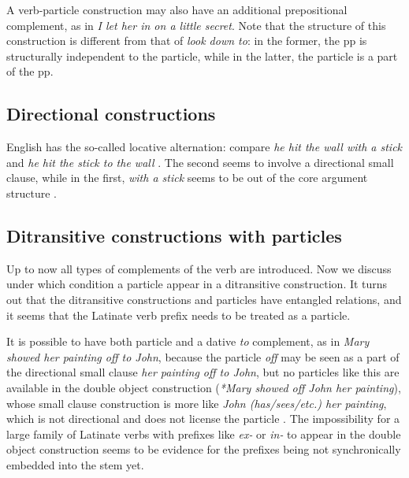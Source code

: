 \documentclass[UTF8, a4paper, oneside, scheme=plain, 12pt]{ctexbook}
\newcommand*{\citesec}[1]{\S~{#1}}
\newcommand{\form}[1]{\emph{#1}}
\begin{document}
A verb-particle construction may also have an additional prepositional complement,
as in \form{I let her in on a little secret}.
Note that the structure of this construction is different from 
that of \form{look down to}:
in the former, the \ac{pp} is structurally independent to the particle,
while in the latter, the particle is a part of the \ac{pp}.

\subsection{Directional constructions}

English has the so-called locative alternation:
compare \form{he hit the wall with a stick}
and \form{he hit the stick to the wall}
\citep[\citesec{4.2}]{dixon2005semantic}.
The second seems to involve a directional small clause,
while in the first, \form{with a stick} seems to be out of 
the core argument structure \citep{acedo2013satellite}. 

\subsection{Ditransitive constructions with particles}\label{sec:clause.ditransitive-particle}

Up to now all types of complements of the verb are introduced.
Now we discuss under which condition a particle appear in a ditransitive construction. 
It turns out that
the ditransitive constructions and particles have entangled relations, 
and it seems that the Latinate verb prefix needs to be treated as a particle.

It is possible to have both particle and a dative \form{to} complement, 
as in \form{Mary showed her painting off to John}, 
because the particle \form{off} may be seen as a part 
of the directional small clause \form{her painting off to John}, 
but no particles like this are available in the double object construction
(\form{*Mary showed off John her painting}),
whose small clause construction is more like \form{John (has/sees/etc.) her painting},
which is not directional and does not license the particle \citep{harley2007bipartite}.
The impossibility for a large family of Latinate verbs 
with prefixes like \form{ex-} or \form{in-}
to appear in the double object construction 
seems to be evidence for the prefixes being not synchronically embedded into the stem yet.
\end{document}
